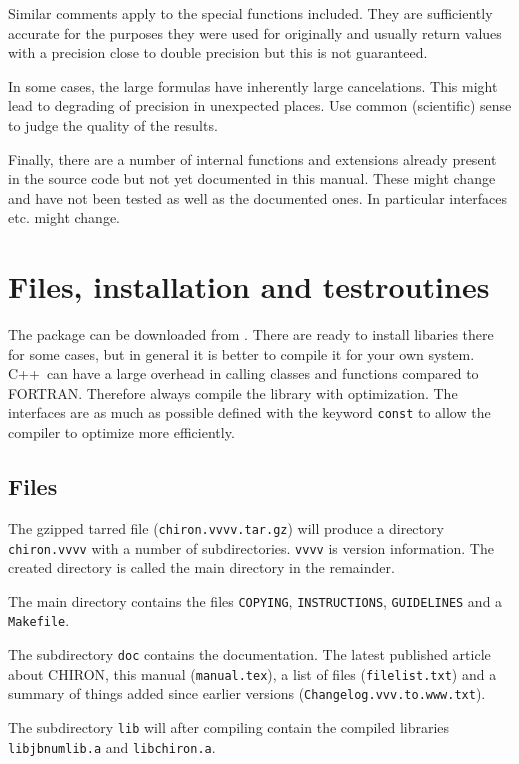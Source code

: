 \documentclass[12pt,a4paper]{article}
\newcommand{\mytt}[1]{\texttt{#1}}
\newcommand{\cpp}{\textsc{C++}}
\newcommand{\fortran}{\textsc{FORTRAN}}
\begin{document}
Similar comments apply to the special functions 
included. They are sufficiently accurate for the purposes they were used for
originally and usually return values with a precision close to
double precision but this is not guaranteed.

In some cases, the large formulas have inherently large cancelations.
This might lead to degrading of precision in unexpected places. Use common
(scientific) sense to judge the quality of the results.

Finally, there are a number of internal functions and extensions
already present in the source code but not yet documented in this manual.
These might change and have not been tested as well as the documented ones.
In particular interfaces etc. might change.

\section{Files, installation and testroutines}

The package can be downloaded from \cite{chironsite}.
There are ready to install libaries there for some cases, but in general
it is better to compile it for your own system.
\cpp\ can have a large overhead in calling classes and functions
compared to \fortran. Therefore always compile the library with
optimization. The interfaces are as much as possible defined with the
keyword \mytt{const} to allow the compiler to optimize more efficiently.

\subsection{Files}
\label{files}

The gzipped tarred file (\mytt{chiron.vvvv.tar.gz}) will produce
a directory \mytt{chiron.vvvv} with a number of subdirectories.
\mytt{vvvv} is version information. The created directory is called the
main directory in the remainder.

The main directory contains the files \mytt{COPYING}, \mytt{INSTRUCTIONS},
\mytt{GUIDELINES} and a \mytt{Makefile}.

The subdirectory \mytt{doc}
contains the documentation. The latest published article
about \textsc{CHIRON}, this manual (\mytt{manual.tex}), a list of files
(\mytt{filelist.txt}) and a summary of things added since earlier versions
(\mytt{Changelog.vvv.to.www.txt}).

The subdirectory \mytt{lib} will after compiling contain the compiled
libraries \mytt{libjbnumlib.a} and \mytt{libchiron.a}.
\end{document}
